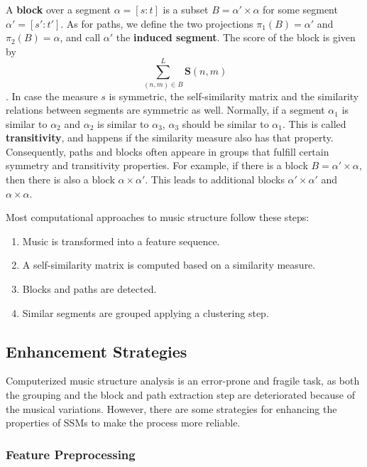 \documentclass[a4paper, 9pt, twocolumn]{extarticle}
\begin{document}
A \textbf{block} over a segment  $\alpha=[s:t]$ is a subset $B=\alpha' \times \alpha$ for some segment $\alpha'=[s':t']$. As for paths, we define the two projections $\pi_{1}(B)= \alpha'$ and $\pi_{2}(B)= \alpha$, and call $\alpha'$ the \textbf{induced segment}. The score of the block is given by \[\sum_{(n,m)\in B}^{L}\textbf{S}(n, m)\].
In case the  measure $s$ is symmetric, the self-similarity matrix and the similarity relations between segments are symmetric as well. Normally, if a segment $\alpha_{1}$ is similar to $\alpha_{2}$ and $\alpha_{2}$ is similar to $\alpha_{3}$, $\alpha_{3}$ should be similar to $\alpha_{1}$. This is called \textbf{transitivity}, and happens if the similarity measure also has that property. Consequently, paths and blocks often appeare in groups that fulfill certain symmetry and transitivity properties. For example, if there is a block $B=\alpha'\times\alpha$, then there is also a block $\alpha\times\alpha'$. This leads to additional blocks $\alpha'\times\alpha'$ and $\alpha\times\alpha$. 

Most computational approaches to music structure follow these steps:

\begin{enumerate}
\item Music is transformed into a feature sequence.\item A self-similarity matrix is computed based on a similarity measure.\item Blocks and paths are detected.\item Similar segments are grouped applying a clustering step.
\end{enumerate}


\subsection{Enhancement Strategies}
\label{subsection:ssmEnhancement}

Computerized music structure analysis is an error-prone and fragile task, as both the grouping and the block and path extraction step are deteriorated because of the musical variations. However, there are some strategies for enhancing the properties of SSMs to make the process more reliable. 

\subsubsection{Feature Preprocessing}
\label{subsubsection:ssmEnhancementFeaturePreprocessing}
\end{document}
